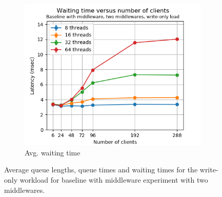 \documentclass[11pt,a4paper]{article}
\begin{document}
\begin{figure}[h]
\begin{subfigure}{.33\textwidth}
\end{subfigure}%
\begin{subfigure}{.33\textwidth}
  \centering
  \includegraphics[width=1.0\linewidth,trim={0px 0px 0px 0px},clip]{img/plot/mwb2-wo-wtime-mini.png}
  \caption{Avg. waiting time}
  \label{fig:mwb2-wo-wtime-mini}
\end{subfigure}
\caption{Average queue lengths, queue times and waiting times for the write-only workload for baseline with middleware experiment with two middlewares.}
\label{fig:mwb2-wo-mini}
\end{figure}
\end{document}
